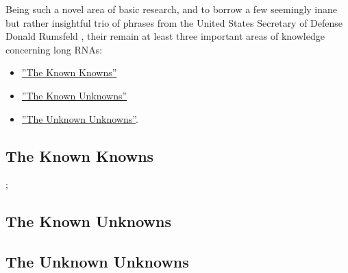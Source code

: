 
Being such a novel area of basic research, and to borrow a few seemingly inane but rather insightful trio of phrases from the United States Secretary of Defense Donald Rumsfeld \citep{Rumsfeld2011}, their remain at least three important areas of knowledge concerning long RNAs: 

\begin{itemize}
  \item \hyperref[subsec: The Known Knowns]{''The Known Knowns''}
  \item \hyperref[subsec: The Known Unknowns]{''The Known Unknowns''}
  \item \hyperref[subsec: The Unknown Unknowns]{''The Unknown Unknowns''}.\\
  \end{itemize}

  \subsection{The Known Knowns}\label{subsec: The Known Knowns};
  \subsection{The Known Unknowns}\label{subsec: The Known Unknowns}
  \subsection{The Unknown Unknowns}\label{subsec: The Unknown Unknowns}